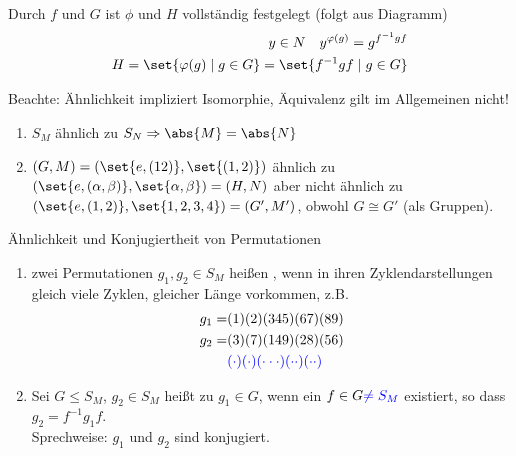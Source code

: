 \begin{*remark}
	Durch $f$ und $G$ ist $\phi$ und $H$ vollständig festgelegt (folgt aus Diagramm)
	\begin{align*}
		y \in N \quad y^{\phi(g)} = g^{f^{-1}gf}\\
		H = \set{\phi(g) \mid g \in G} = \set{f^{-1}gf \mid g \in G}
	\end{align*}
\end{*remark}
Beachte: Ähnlichkeit impliziert Isomorphie, Äquivalenz gilt im Allgemeinen nicht!
\begin{example}
	\begin{enumerate}
		\item $S_M$ ähnlich zu $S_N \implies \abs{M} = \abs{N}$
		\item $(G,M) = (\set{e, (12)}, \set{(1,2)})$ ähnlich zu $(\set{e, (\alpha, \beta)}, \set{\alpha, \beta}) = (H,N)$ aber nicht ähnlich zu $(\set{e, (1,2)}, \set{1,2,3,4}) = (G',M')$, obwohl $G \cong G'$ (als Gruppen).
	\end{enumerate}
\end{example}
\begin{definition}
	Ähnlichkeit und Konjugiertheit von Permutationen
	\begin{enumerate}
		\item zwei Permutationen $g_1, g_2 \in S_M$ heißen , wenn in ihren Zyklendarstellungen gleich viele Zyklen, gleicher Länge vorkommen, z.B.
		\begin{align*}
			g_1 =& (1)(2)(345)(67)(89)\\
			g_2 =& (3)(7)(149)(28)(56)\\
				 & \textcolor{blue}{(\cdot)(\cdot)(\cdot\cdot\cdot)(\cdot\cdot)(\cdot\cdot)}
		\end{align*}
		\item Sei $G \le S_M$, $g_2 \in S_M$ heißt  zu $g_1 \in G$, wenn ein $f \in G \textcolor{blue}{\neq S_M}$ existiert, so dass $g_2 = f^{-1}g_1 f$.\\
		Sprechweise: $g_1$ und $g_2$ sind konjugiert.
	\end{enumerate}
\end{definition}